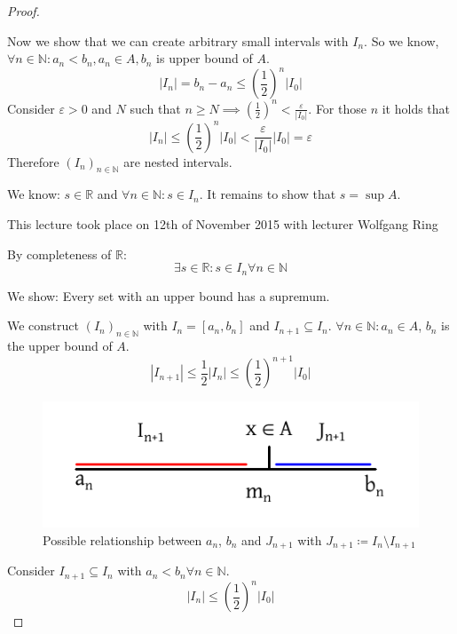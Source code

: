 \documentclass[a4paper,landscape,twocolumn]{article}
\theoremstyle{definition}
\newcommand\abs[1]{\left|#1\right|}
\newcommand\meta[3]{\begin{mdframed}[skipbelow=4pt,skipabove=4pt,innermargin=1pt,innerleftmargin=1pt,innerrightmargin=1pt]\begin{center}\small{\textdownarrow{} This #1 took place on #2 with lecturer #3}\end{center}\end{mdframed}}
\begin{document}
\begin{proof}
\begin{description}
\begin{description}
          Now we show that we can create arbitrary small intervals with $I_n$.
          So we know, $\forall n \in \mathbb N: a_n < b_n, a_n \in A, b_n$
          is upper bound of $A$.
          \[ \abs{I_n} = b_n - a_n \leq \left(\frac12\right)^n \abs{I_0} \]
          Consider $\varepsilon > 0$ and $N$ such that $n \geq N \implies
          \left(\frac12\right)^n < \frac{\varepsilon}{\abs{I_0}}$.
          For those $n$ it holds that
          \[ \abs{I_n} \leq \left(\frac12\right)^n \abs{I_0} < \frac{\varepsilon}{\abs{I_0}} \abs{I_0} = \varepsilon \]
          Therefore $(I_n)_{n \in \mathbb N}$ are nested intervals.
      \end{description}
  \end{description}

  We know:
  $s \in \mathbb R$ and $\forall n \in \mathbb N: s \in I_n$.
  It remains to show that $s = \sup{A}$.

  \meta{lecture}{12th of November 2015}{Wolfgang Ring}

  By completeness of $\mathbb{R}$:
  \[ \exists s \in \mathbb R: s \in I_n \forall n \in \mathbb N \]

  We show: Every set with an upper bound has a supremum.

  We construct $(I_n)_{n \in \mathbb N}$ with $I_n = [a_n, b_n]$ and $I_{n+1} \subseteq I_n$.
  $\forall n \in \mathbb N: a_n \in A$, $b_n$ is the upper bound of $A$.
  \[ \abs{I_{n+1}} \leq \frac12 \abs{I_n} \leq \left(\frac12\right)^{n+1} \abs{I_0} \]

  \begin{figure}[!h]
    \begin{center}
      \includegraphics{img/proof_interval.pdf}
      \caption[width=200pt]{Possible relationship between $a_n$, $b_n$ and $J_{n+1}$ with $J_{n+1} \coloneqq I_n \setminus I_{n+1}$}
    \end{center}
  \end{figure}

  Consider $I_{n+1} \subseteq I_n$ with $a_n < b_n \forall n \in \mathbb N$.
  \[ \abs{I_n} \leq \left(\frac12\right)^n \abs{I_0} \]


\end{proof}
\end{document}
